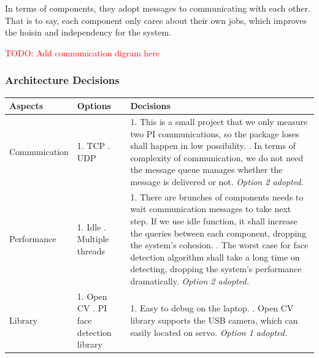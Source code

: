 \documentclass[11pt,a4paper,titlepage]{report}
\begin{document}
In terms of components, they adopt messages to communicating with each other. That is to say, each component only cares about their own jobs, which improves the hoisin and independency for the system.

\textcolor{red}{TODO: Add communication digram here}


\subsubsection{Architecture Decisions}

\begin{center}
\begin{table}
\begin{tabular}{|p{}|p{}|p{}|}
    \hline
    \textbf{Aspects} & \textbf{Options} & \textbf{Decisions} \\ \hline
    
     Communication & 1. TCP \newline 2. UDP & 1. This is a small project that we only measure two PI communications, so the package loses shall happen in low possibility. \newline  2. In terms of complexity of communication, we do not need the message queue manages whether the message is delivered or not. \newline \textit{Option 2 adopted.
} \\ \hline

     Performance & 1. Idle \newline 2. Multiple threads & 1. There are brunches of components needs to wait communication messages to take next step. If we use idle function, it shall increase the queries between each component, dropping the system's cohesion. \newline  2. The worst case for face detection algorithm shall take a long time on detecting, dropping the system’s performance dramatically. \newline \textit{Option 2 adopted.
} \\ \hline

     Library & 1. Open CV \newline 2. PI face detection library & 1. Easy to debug on the laptop. \newline  2. Open CV library supports the USB camera, which can easily located on servo. \newline \textit{Option 1 adopted.
} \\ \hline
     

\end{tabular}
\end{table}
\end{center}
\end{document}
